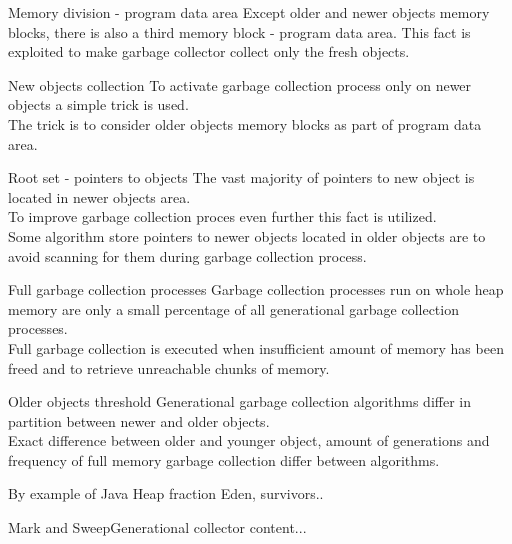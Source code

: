 \documentclass[presentation]{beamer}
\begin{document}
\begin{frame}{Memory division - program data area}
	Except older and newer objects memory blocks, there is also a third memory block - program data area.
	\newline
	This fact is exploited to make garbage collector collect only the fresh objects.
\end{frame}

\begin{frame}{New objects collection}
	To activate garbage collection process only on newer objects a simple trick is used.
	\\
	The trick is to consider older objects memory blocks as part of program data area.
\end{frame}

\begin{frame}{Root set - pointers to objects}
	The vast majority of pointers to new object is located in newer objects area.
	\\
	To improve garbage collection proces even further this fact is utilized.
	\\
	Some algorithm store pointers to newer objects located in older objects are to avoid scanning for them during garbage collection process.
\end{frame}

\begin{frame}{Full garbage collection processes}
	Garbage collection processes run on whole heap memory are only a small percentage of all generational garbage collection processes.
	\\
	Full garbage collection is executed when insufficient 
	amount of memory has been freed and to retrieve unreachable chunks of memory.
\end{frame}

\begin{frame}{Older objects threshold}
	Generational garbage collection algorithms differ in partition between newer and older objects.
	\\
	Exact difference between older and younger object, amount of generations and frequency of full memory garbage collection differ between algorithms.
\end{frame}


\begin{frame}
By example of Java Heap fraction Eden, survivors..
\end{frame}

\begin{frame}{Mark and Sweep}{Generational collector}
content...
\end{frame}
\end{document}
